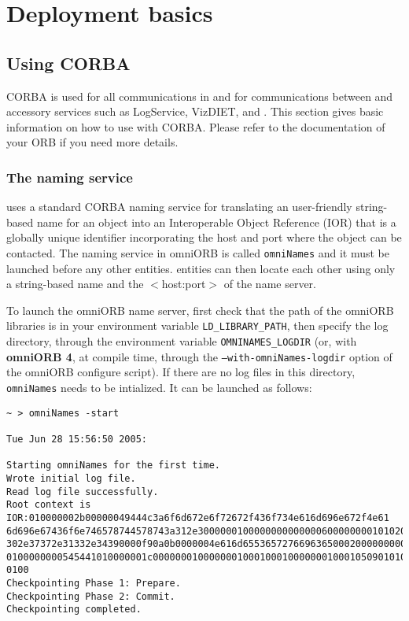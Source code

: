 \section{Deployment basics}
\label{sec:deployBasics}

\subsection{Using CORBA} 
\label{sec:CORBA_services}

CORBA is used for all communications in \diet and for communications between
\diet and accessory services such as LogService, VizDIET, and \godiet.  This
section gives basic information on how to use \diet with CORBA.  Please refer
to the documentation of your ORB if you need more details.

\subsubsection{The naming service}

\diet uses a standard CORBA naming service for translating an user-friendly
string-based name for an object into an Interoperable Object Reference (IOR)
that is a globally unique identifier incorporating the host and port where the
object can be contacted.  The naming service in omniORB is called
\texttt{omniNames} and it must be launched before any other \diet entities.
\diet entities can then locate each other using only a string-based name and
the $<$host:port$>$ of the name server.

To launch the omniORB name server, first check that the path of the omniORB
libraries is in your environment variable \texttt{LD\_LIBRARY\_PATH}, then
specify the log directory, through the environment variable
\texttt{OMNINAMES\_LOGDIR} (or, with \textbf{omniORB 4}, at compile time,
through the \texttt{--with-omniNames-logdir} option of the omniORB configure
script). If there are no log files in this directory, \texttt{omniNames} needs
to be intialized. It can be launched as follows:

{\footnotesize
\begin{verbatim}
~ > omniNames -start

Tue Jun 28 15:56:50 2005:

Starting omniNames for the first time.
Wrote initial log file.
Read log file successfully.
Root context is IOR:010000002b00000049444c3a6f6d672e6f72672f436f734e616d696e672f4e61
6d696e67436f6e746578744578743a312e300000010000000000000060000000010102000d0000003134
302e37372e31332e34390000f90a0b0000004e616d655365727669636500020000000000000008000000
0100000000545441010000001c0000000100000001000100010000000100010509010100010000000901
0100
Checkpointing Phase 1: Prepare.
Checkpointing Phase 2: Commit.
Checkpointing completed.
\end{verbatim}
}

